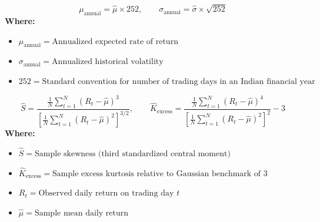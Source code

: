 \begin{formulabox}
\begin{equation*}
\mu_{\text{annual}} = \hat{\mu} \times 252, \qquad \sigma_{\text{annual}} = \hat{\sigma} \times \sqrt{252}
\end{equation*}
\textbf{Where:}
\begin{itemize}[leftmargin=1.8em, noitemsep]
    \item $\mu_{\text{annual}} = \text{Annualized expected rate of return}$
    \item $\sigma_{\text{annual}} = \text{Annualized historical volatility}$
    \item $252 = \text{Standard convention for number of trading days in an Indian financial year}$
\end{itemize}
\end{formulabox}

\begin{formulabox}
\begin{equation*}
\hat{S} = \frac{\frac{1}{N}\sum_{t=1}^N (R_t - \hat{\mu})^3}{\left[\frac{1}{N}\sum_{t=1}^N (R_t - \hat{\mu})^2\right]^{3/2}}, \qquad \hat{K}_{\text{excess}} = \frac{\frac{1}{N}\sum_{t=1}^N (R_t - \hat{\mu})^4}{\left[\frac{1}{N}\sum_{t=1}^N (R_t - \hat{\mu})^2\right]^2} - 3
\end{equation*}
\textbf{Where:}
\begin{itemize}[leftmargin=1.8em, noitemsep]
    \item $\hat{S} = \text{Sample skewness (third standardized central moment)}$
    \item $\hat{K}_{\text{excess}} = \text{Sample excess kurtosis relative to Gaussian benchmark of } 3$
    \item $R_t = \text{Observed daily return on trading day } t$
    \item $\hat{\mu} = \text{Sample mean daily return}$
\end{itemize}
\end{formulabox}

